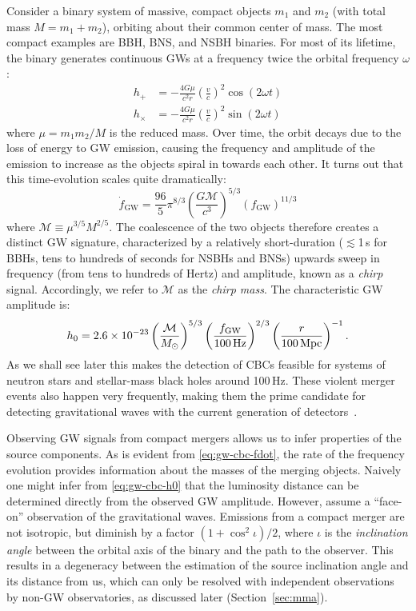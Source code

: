Consider a binary system of massive, compact objects $m_1$ and $m_2$ (with total mass $M = m_1 + m_2$), orbiting about their common center of mass.
The most compact examples are \ac{BBH}, \ac{BNS}, and \ac{NSBH} binaries.
For most of its lifetime, the binary generates continuous \acp{GW} at a frequency twice the orbital frequency $\omega$:
\begin{align}
	\label{eq:gw-cbc-hplus}
	h_+ &= -\frac{4 G \mu}{c^2 r} \left(\frac{v}{c}\right)^2 \cos (2 \omega t) \\
	\label{eq:gw-cbc-hcross}
	h_{\times} &= -\frac{4 G \mu}{c^2 r} \left(\frac{v}{c}\right)^2 \sin (2 \omega t)
\end{align}
where $\mu = m_1 m_2 / M$ is the reduced mass.
Over time, the orbit decays due to the loss of energy to \ac{GW} emission, causing the frequency and amplitude of the emission to increase as the objects spiral in towards each other.
It turns out that this time-evolution scales quite dramatically:
\begin{equation}\label{eq:gw-cbc-fdot}
	\dot{f}_{\textrm{GW}} = \frac{96}{5}\pi^{8/3} \left(\frac{G \mathcal{M}}{c^3}\right)^{5/3} (f_{\textrm{GW}})^{11/3}
\end{equation}
where $\mathcal{M} \equiv \mu^{3/5} M^{2/5}$.
The coalescence of the two objects therefore creates a distinct \ac{GW} signature, characterized by a relatively short-duration ($\lesssim$1\,s for \acp{BBH}, tens to hundreds of seconds for \acp{NSBH} and \acp{BNS}) upwards sweep in frequency (from tens to hundreds of Hertz) and amplitude, known as a \textit{chirp} signal.
Accordingly, we refer to $\mathcal{M}$ as the \textit{chirp mass}.
The characteristic GW amplitude is:
\begin{equation}\label{eq:gw-cbc-h0}
	h_0 = 2.6 \times 10^{-23} \left( \frac{\mathcal{M}}{M_{\odot}} \right)^{5/3} \left( \frac{f_{\mathrm{GW}}}{100\,\mathrm{Hz}} \right)^{2/3} \left( \frac{r}{100\,\mathrm{Mpc}} \right)^{-1}.
\end{equation}
As we shall see later this makes the detection of \acp{CBC} feasible for systems of neutron stars and stellar-mass black holes around 100\,Hz.
These violent merger events also happen very frequently, making them the prime candidate for detecting gravitational waves with the current generation of detectors~\citep{aLIGO_prospects}.

Observing GW signals from compact mergers allows us to infer properties of the source components.
As is evident from \cref{eq:gw-cbc-fdot}, the rate of the frequency evolution provides information about the masses of the merging objects.
Naively one might infer from \cref{eq:gw-cbc-h0} that the luminosity distance can be determined directly from the observed GW amplitude.
However,  assume a ``face-on'' observation of the gravitational waves.
Emissions from a compact merger are not isotropic, but diminish by a factor $(1 + \cos^2 \iota) / 2$, where $\iota$ is the \textit{inclination angle} between the orbital axis of the binary and the path to the observer.
This results in a degeneracy between the estimation of the source inclination angle and its distance from us, which can only be resolved with independent observations by non-GW observatories, as discussed later (Section~\ref{sec:mma}).


